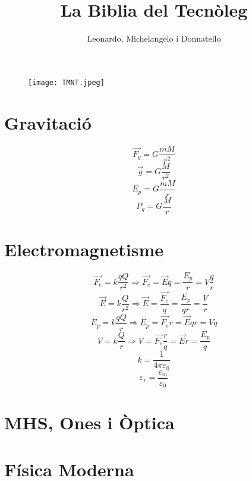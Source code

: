 \documentclass{article}
\title{La Biblia del Tecnòleg}
\author{Leonardo, Michelangelo i Donnatello}
\begin{document}
\begin{figure}
\centering
\texttt{[image: TMNT.jpeg]}
\end{figure}

\maketitle

\newpage
\section{Gravitació}
\[\vec{F_g}=G\frac{mM}{r^2}\]
\[\vec{g}=G\frac{M}{r^2}\]
\[E_p=G\frac{mM}{r}\]
\[P_g=G\frac{M}{r}\]


\section{Electromagnetisme}
\[\vec{F_e}=k\frac{qQ}{r^2} \Longrightarrow \vec{F_e}=\vec{E}q=\frac{E_p}{r}=V\frac{q}{r}\]
\[\vec{E}=k\frac{Q}{r^2} \Longrightarrow \vec{E}=\frac{\vec{F_e}}{q}=\frac{E_p}{qr}=\frac{V}{r}\]
\[E_p=k\frac{qQ}{r} \Longrightarrow E_p=\vec{F_e}r=\vec{E}qr=Vq\]
\[V=k\frac{Q}{r} \Longrightarrow V=\vec{F_e}\frac{r}{q}=\vec{E}r=\frac{E_p}{q}\]
\[k=\frac{1}{4\pi\varepsilon_0}\]
\[\varepsilon_r=\frac{\varepsilon_m}{\varepsilon_0}\]


\section{MHS, Ones i Òptica}
\section{Física Moderna}
\end{document}
